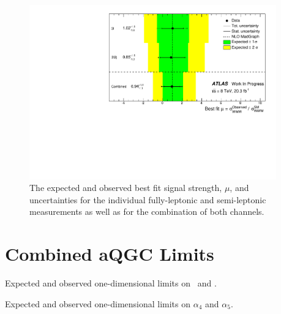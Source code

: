\begin{figure}[htb]
\centering
\includegraphics[width=0.95\textwidth]{figures/statistics/summary_mu_combination.pdf}
\caption{The expected and 
observed best fit signal strength, $\mu$, 
and uncertainties for the individual fully-leptonic and
semi-leptonic measurements as well as for 
the combination of both channels.}
\label{fig:summary_mu_combination}
\end{figure}






\section{Combined aQGC Limits}
\label{sec:combined_aqgc}


\begin{table}[h!]
  \begin{center}
  
    \caption{Expected and observed one-dimensional limits on \fszero~and \fsone.}
    \label{tab:aqgc_combined_1d}

  \end{center}

\end{table}
\begin{table}[h!]
  \begin{center}
  
    \caption{Expected and observed one-dimensional limits on $\alpha_4$ and $\alpha_5$.}
    \label{tab:aqgc_combined_1d_alpha45}

  \end{center}
\end{table}


